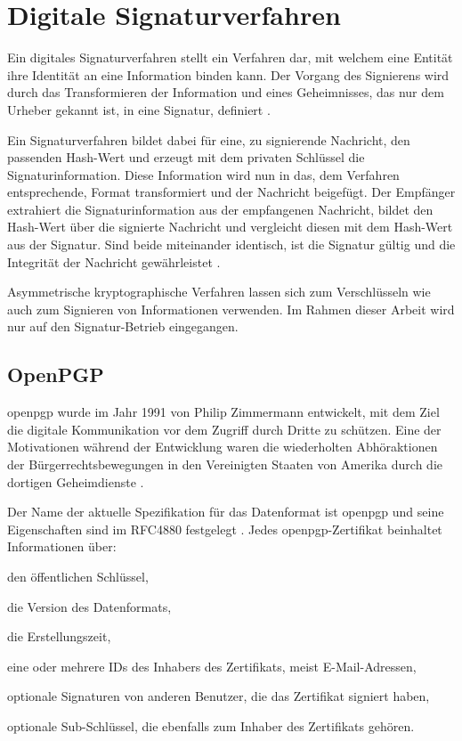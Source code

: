\section{Digitale Signaturverfahren}
\label{sec:GrundlagenDefinitionen:DigitaleSignaturen:Verfahren}
Ein digitales Signaturverfahren stellt ein Verfahren dar, mit welchem eine Entität ihre Identität an eine Information binden kann. Der Vorgang des Signierens
wird durch das Transformieren der Information und eines Geheimnisses, das nur dem Urheber gekannt ist, in eine Signatur, definiert \cite{hac}.

Ein Signaturverfahren bildet dabei für eine, zu signierende Nachricht, den passenden Hash-Wert und erzeugt mit dem privaten Schlüssel die Signaturinformation.
Diese Information wird nun in das, dem Verfahren entsprechende, Format transformiert und der Nachricht beigefügt.
Der Empfänger extrahiert die Signaturinformation aus der empfangenen Nachricht, bildet den Hash-Wert über die signierte Nachricht und vergleicht diesen mit dem
Hash-Wert aus der Signatur. Sind beide miteinander identisch, ist die Signatur gültig und die Integrität der Nachricht gewährleistet \cite{hac,singh:messages}.

Asymmetrische kryptographische Verfahren lassen sich zum Verschlüsseln wie auch zum Signieren von Informationen verwenden. Im Rahmen dieser Arbeit wird nur auf
den Signatur-Betrieb eingegangen.

\subsection{OpenPGP}
\label{sec:GrundlagenDefinitionen:DigitaleSignaturen:Verfahren:openpgp}
\gls{openpgp} wurde im Jahr 1991 von Philip Zimmermann \cite{zimmermann:pgp,pgp} entwickelt, mit dem Ziel die digitale Kommunikation vor dem Zugriff durch Dritte zu
schützen. Eine der Motivationen während der Entwicklung waren die wiederholten Abhöraktionen der Bürgerrechtsbewegungen in den Vereinigten Staaten von Amerika
durch die dortigen Geheimdienste \cite{singh:messages}.

Der Name der aktuelle Spezifikation für das Datenformat ist \gls{openpgp} und seine Eigenschaften sind im RFC4880 festgelegt \cite{openpgp:ietf}. 
Jedes \gls{openpgp}-Zertifikat beinhaltet Informationen über:
\begin{itemize*}
    \item den öffentlichen Schlüssel,
    \item die Version des Datenformats,
    \item die Erstellungszeit,
    \item eine oder mehrere IDs des Inhabers des Zertifikats, meist E-Mail-Adressen,
    \item optionale Signaturen von anderen Benutzer, die das Zertifikat signiert haben,
    \item optionale Sub-Schlüssel, die ebenfalls zum Inhaber des Zertifikats gehören.
\end{itemize*}

